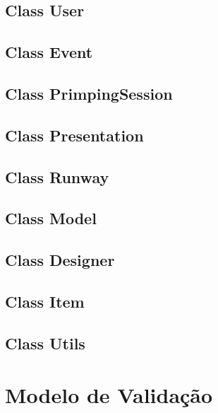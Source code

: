 \documentclass{article}
\begin{document}

\subsection{Class User}


\subsection{Class Event}


\subsection{Class PrimpingSession}


\subsection{Class Presentation}


\subsection{Class Runway}


\subsection{Class Model}


\subsection{Class Designer}

\subsection{Class Item}


\subsection{Class Utils}



\section{Modelo de Validação}
\end{document}

